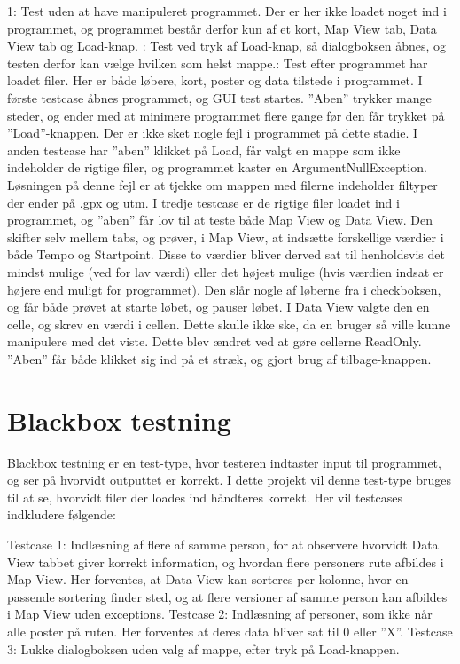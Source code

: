 1: Test uden at have manipuleret programmet. Der er her ikke loadet noget ind i programmet, og programmet består derfor kun af et kort, Map View tab, Data View tab og Load-knap. : Test ved tryk af Load-knap, så dialogboksen åbnes, og testen derfor kan vælge hvilken som helst mappe.: Test efter programmet har loadet filer. Her er både løbere, kort, poster og data tilstede i programmet.\newline
I første testcase åbnes programmet, og GUI test startes. ”Aben” trykker mange steder, og ender med at minimere programmet flere gange før den får trykket på ”Load”-knappen. Der er ikke sket nogle fejl i programmet på dette stadie.\newline
I anden testcase har ”aben” klikket på Load, får valgt en mappe som ikke indeholder de rigtige filer, og programmet kaster en ArgumentNullException. Løsningen på denne fejl er at tjekke om mappen med filerne indeholder filtyper der ender på .gpx og utm. \newline
I tredje testcase er de rigtige filer loadet ind i programmet, og ”aben” får lov til at teste både Map View og Data View. Den skifter selv mellem tabs, og prøver, i Map View, at indsætte forskellige værdier i både Tempo og Startpoint. Disse to værdier bliver derved sat til henholdsvis det mindst mulige (ved for lav værdi) eller det højest mulige (hvis værdien indsat er højere end muligt for programmet). Den slår nogle af løberne fra i checkboksen, og får både prøvet at starte løbet, og pauser løbet. I Data View valgte den en celle, og skrev en værdi i cellen. Dette skulle ikke ske, da en bruger så ville kunne manipulere med det viste. Dette blev ændret ved at gøre cellerne ReadOnly. ”Aben” får både klikket sig ind på et stræk, og gjort brug af tilbage-knappen.

\section{Blackbox testning}
Blackbox testning er en test-type, hvor testeren indtaster input til programmet, og ser på hvorvidt outputtet er korrekt. I dette projekt vil denne test-type bruges til at se, hvorvidt filer der loades ind håndteres korrekt. Her vil testcases indkludere følgende:

Testcase 1: Indlæsning af flere af samme person, for at observere hvorvidt Data View tabbet giver korrekt information, og hvordan flere personers rute afbildes i Map View. Her forventes, at Data View kan sorteres per kolonne, hvor en passende sortering finder sted, og at flere versioner af samme person kan afbildes i Map View uden exceptions.\newline
Testcase 2: Indlæsning af personer, som ikke når alle poster på ruten. Her forventes at deres data bliver sat til 0 eller ”X”.\newline
Testcase 3: Lukke dialogboksen uden valg af mappe, efter tryk på Load-knappen.\newline


